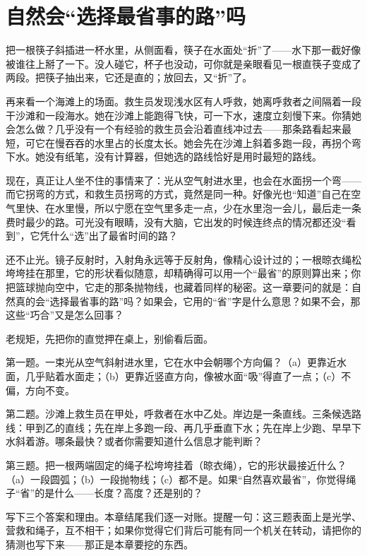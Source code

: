 \chapter{自然会“选择最省事的路”吗}


\begin{mainline}
把一根筷子斜插进一杯水里，从侧面看，筷子在水面处“折”了——水下那一截好像被谁往上掰了一下。没人碰它，杯子也没动，可你就是亲眼看见一根直筷子变成了两段。把筷子抽出来，它还是直的；放回去，又“折”了。

再来看一个海滩上的场面。救生员发现浅水区有人呼救，她离呼救者之间隔着一段干沙滩和一段海水。她在沙滩上能跑得飞快，可一下水，速度立刻慢下来。你猜她会怎么做？几乎没有一个有经验的救生员会沿着直线冲过去——那条路看起来最短，可它在慢吞吞的水里占的长度太长。她会先在沙滩上斜着多跑一段，再拐个弯下水。她没有纸笔，没有计算器，但她选的路线恰好是用时最短的路线。

现在，真正让人坐不住的事情来了：光从空气射进水里，也会在水面拐一个弯——而它拐弯的方式，和救生员拐弯的方式，竟然是同一种。好像光也“知道”自己在空气里快、在水里慢，所以宁愿在空气里多走一点，少在水里泡一会儿，最后走一条费时最少的路。可光没有眼睛，没有大脑，它出发的时候连终点的情况都还没“看到”，它凭什么“选”出了最省时间的路？

还不止光。镜子反射时，入射角永远等于反射角，像精心设计过的；一根晾衣绳松垮垮挂在那里，它的形状看似随意，却精确得可以用一个“最省”的原则算出来；你把篮球抛向空中，它走的那条抛物线，也藏着同样的秘密。这一章要问的就是：自然真的会“选择最省事的路”吗？如果会，它用的“省”字是什么意思？如果不会，那这些“巧合”又是怎么回事？
\end{mainline}


老规矩，先把你的直觉押在桌上，别偷看后面。

第一题。一束光从空气斜射进水里，它在水中会朝哪个方向偏？（a）更靠近水面，几乎贴着水面走；（b）更靠近竖直方向，像被水面“吸”得直了一点；（c）不偏，方向不变。

第二题。沙滩上救生员在甲处，呼救者在水中乙处。岸边是一条直线。三条候选路线：甲到乙的直线；先在岸上多跑一段、再几乎垂直下水；先在岸上少跑、早早下水斜着游。哪条最快？或者你需要知道什么信息才能判断？

第三题。把一根两端固定的绳子松垮垮挂着（晾衣绳），它的形状最接近什么？（a）一段圆弧；（b）一段抛物线；（c）都不是。如果“自然喜欢最省”，你觉得绳子“省”的是什么——长度？高度？还是别的？

写下三个答案和理由。本章结尾我们逐一对账。提醒一句：这三题表面上是光学、营救和绳子，互不相干；如果你觉得它们背后可能有同一个机关在转动，请把你的猜测也写下来——那正是本章要挖的东西。

